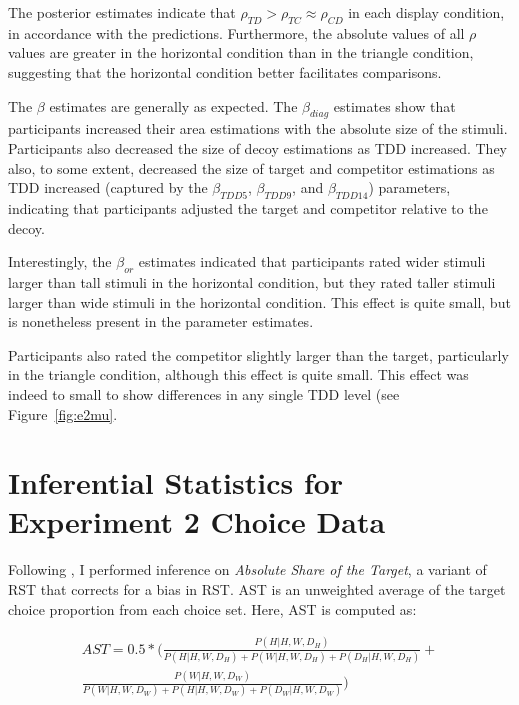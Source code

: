 The posterior estimates indicate that $\rho_{TD}>\rho_{TC}\approx\rho_{CD}$ in each display condition, in accordance with the predictions. Furthermore, the absolute values of all $\rho$ values are greater in the horizontal condition than in the triangle condition, suggesting that the horizontal condition better facilitates comparisons. 

The $\beta$ estimates are generally as expected. The $\beta_{diag}$ estimates show that participants increased their area estimations with the absolute size of the stimuli. Participants also decreased the size of decoy estimations as TDD increased. They also, to some extent, decreased the size of target and competitor estimations as TDD increased (captured by the $\beta_{TDD5}$, $\beta_{TDD9}$, and $\beta_{TDD14}$) parameters, indicating that participants adjusted the target and competitor relative to the decoy.

Interestingly, the $\beta_{or}$ estimates indicated that participants rated wider stimuli larger than tall stimuli in the horizontal condition, but they rated taller stimuli larger than wide stimuli in the horizontal condition. This effect is quite small, but is nonetheless present in the parameter estimates.

Participants also rated the competitor slightly larger than the target, particularly in the triangle condition, although this effect is quite small. This effect was indeed to small to show differences in any single TDD level (see Figure~\ref{fig:e2mu}. 

\chapter{Inferential Statistics for Experiment 2 Choice Data}

Following \textcite{katsimpokisRobustBayesianTest2022}, I performed inference on \textit{Absolute Share of the Target}, a variant of RST that corrects for a bias in RST. AST is an unweighted average of the target choice proportion from each choice set. Here, AST is computed as:

\begin{equation}
    \begin{aligned}
        AST=0.5*(\frac{P(H|{H,W,D_{H}})}{P(H|{H,W,D_{H}})+P(W|{H,W,D_{H}})+P(D_{H}|{H,W,D_{H}})}+ \\ \frac{P(W|{H,W,D_{W}})}{P(W|{H,W,D_{W}})+P(H|{H,W,D_{W}})+P(D_{W}|{H,W,D_{W}})})
    \end{aligned}
\end{equation}

